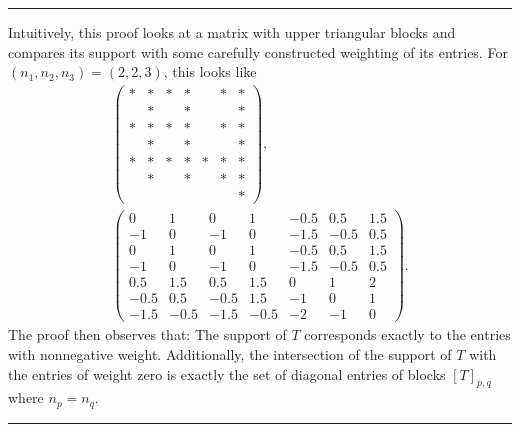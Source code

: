\documentclass{article}
\begin{document}
\rule{0.5\linewidth}{\linethickness}

Intuitively, this proof looks at a matrix with upper triangular blocks and compares its support with some carefully constructed weighting of its entries. For $(n_1,n_2,n_3) = (2,2,3)$, this looks like
\begin{gather*}
\left(\begin{array}
	{cc|cc|ccc}
	* & * & * & * &  & * & *\\
	& * & & * & & & *\\\hline
	* & * & * & * &  & * & *\\
	& * & & * & & & *\\\hline
	* & * & * & * & * & * & *\\
	& * & & * & & * & *\\
	& & & & & & *
\end{array}\right),\\
\left(\begin{array}
	{cc|cc|ccc}
	0 & 1 & 0 & 1 & -0.5 & 0.5 & 1.5\\
	-1 & 0 & -1 & 0 & -1.5 & -0.5 & 0.5\\\hline
	0 & 1 & 0 & 1 & -0.5 & 0.5 & 1.5\\
	-1 & 0 & -1 & 0 & -1.5 & -0.5 & 0.5\\\hline
	0.5 & 1.5 & 0.5 & 1.5 & 0 & 1 & 2\\
	-0.5& 0.5 & -0.5 & 1.5 & -1 & 0 & 1\\
	-1.5 & -0.5 & -1.5 & -0.5 & -2 & -1 & 0
\end{array}\right).
\end{gather*}
The proof then observes that: 
The support of $T$ corresponds exactly to the entries with nonnegative weight. Additionally, the intersection of the support of $T$ with the entries of weight zero is exactly the set of diagonal entries of blocks $[T]_{p,q}$ where $n_p = n_q$.

\rule{0.5\linewidth}{\linethickness}
\end{document}
